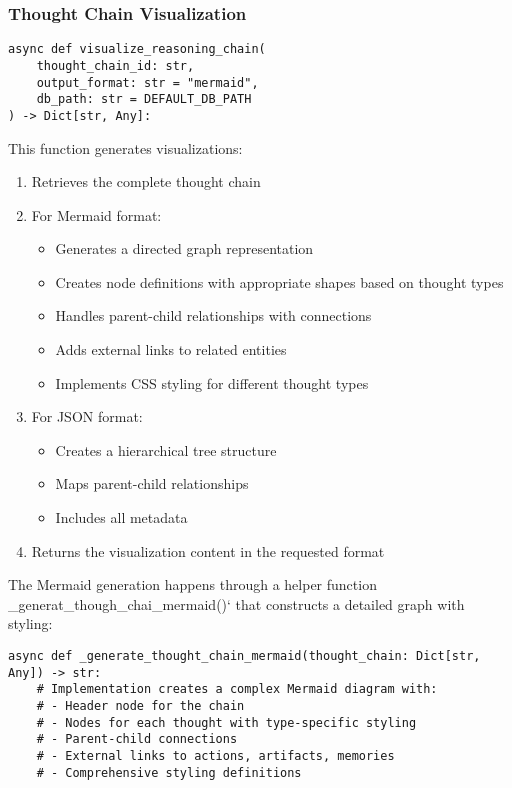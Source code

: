 \documentclass[12pt,a4paper]{article}
\begin{document}
\subsubsection*{Thought Chain Visualization}
\begin{pageablecode}
\begin{verbatim}
async def visualize_reasoning_chain(
    thought_chain_id: str,
    output_format: str = "mermaid",
    db_path: str = DEFAULT_DB_PATH
) -> Dict[str, Any]:
\end{verbatim}
\end{pageablecode}
This function generates visualizations:
\begin{enumerate}[label=\arabic*.]
    \item Retrieves the complete thought chain
    \item For Mermaid format:
    \begin{itemize}
        \item Generates a directed graph representation
        \item Creates node definitions with appropriate shapes based on thought types
        \item Handles parent-child relationships with connections
        \item Adds external links to related entities
        \item Implements CSS styling for different thought types
    \end{itemize}
    \item For JSON format:
    \begin{itemize}
        \item Creates a hierarchical tree structure
        \item Maps parent-child relationships
        \item Includes all metadata
    \end{itemize}
    \item Returns the visualization content in the requested format
\end{enumerate}

The Mermaid generation happens through a helper function \1\_generat\1\_though\1\_chai\1\_mermaid()` that constructs a detailed graph with styling:
\begin{pageablecode}
\begin{verbatim}
async def _generate_thought_chain_mermaid(thought_chain: Dict[str, Any]) -> str:
    # Implementation creates a complex Mermaid diagram with:
    # - Header node for the chain
    # - Nodes for each thought with type-specific styling
    # - Parent-child connections
    # - External links to actions, artifacts, memories
    # - Comprehensive styling definitions
\end{verbatim}
\end{pageablecode}
\end{document}
